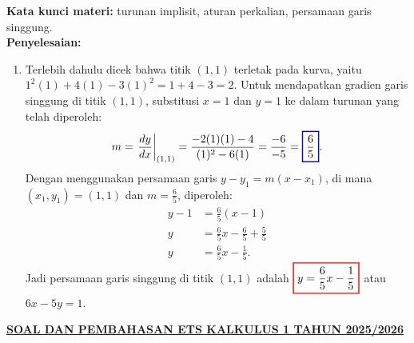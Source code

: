 \documentclass[10pt,openany,a4paper]{article}
\theoremstyle{definition}
\theoremstyle{definition}
\theoremstyle{plain}
\newenvironment{jawab}[2][tes]{%
\par\noindent\textbf{Kata kunci materi:} #1.\\
\textbf{Penyelesaian:} #2%
}{}
\begin{document}
\begin{enumerate}
\begin{jawab}[turunan implisit, aturan perkalian, persamaan garis singgung]
{\begin{enumerate}
                    \item Terlebih dahulu dicek bahwa titik $(1,1)$ terletak pada kurva, yaitu $1^2(1)+4(1)-3(1)^2=1+4-3=2$. Untuk mendapatkan gradien garis singgung di titik $(1,1)$, substitusi $x=1$ dan $y=1$ ke dalam turunan yang telah diperoleh:
                    \begin{align*}
                        m=\left.\frac{dy}{dx}\right|_{(1,1)} = \frac{-2(1)(1) - 4}{(1)^2 - 6(1)}= \frac{-6}{-5}= \colorlet{oldcolor}{.}
        \color{blue}
        \setlength{\fboxrule}{1pt} \boxed{\color{oldcolor}\frac{6}{5}}\color{oldcolor}.
                    \end{align*}
                    Dengan menggunakan persamaan garis $y - y_1 = m(x - x_1)$, di mana $(x_1,y_1)=(1,1)$ dan $m=\frac{6}{5}$, diperoleh:
                    \begin{align*}
                        y - 1 &= \frac{6}{5}(x - 1)\\
                        y &= \frac{6}{5}x - \frac{6}{5} + \frac{5}{5}\\
                        y &= \frac{6}{5}x - \frac{1}{5}.
                    \end{align*}
                    Jadi persamaan garis singgung di titik $(1,1)$ adalah $\colorlet{oldcolor}{.}
        \color{red}
        \setlength{\fboxrule}{1pt} \boxed{\color{oldcolor}y = \frac{6}{5}x - \frac{1}{5}}\color{oldcolor}$ atau $6x-5y=1$.
                \end{enumerate}
            }
            \end{jawab}
        \end{enumerate}
\newpage
 \begin{center}
	{\underline{\textbf{\MakeUppercase{Soal dan Pembahasan ETS Kalkulus 1 Tahun 2025/2026}}}}
    \end{center}
\end{document}

